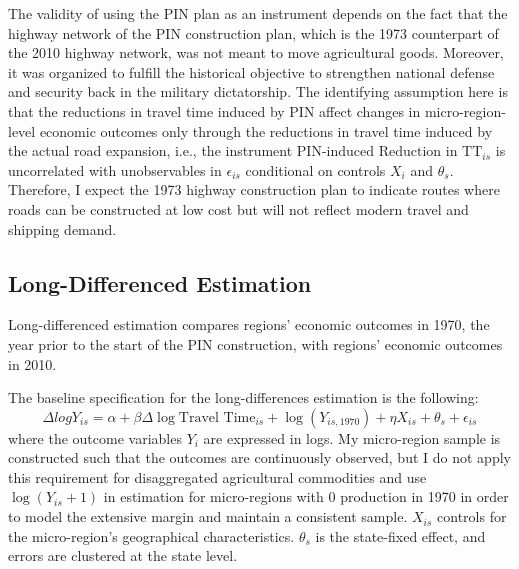 \documentclass[11pt]{article}
\begin{document}
The validity of using the PIN plan as an instrument depends on the fact that the highway network of the PIN construction plan, which is the 1973 counterpart of the 2010 highway network, was not meant to move agricultural goods. Moreover, it was organized to fulfill the historical objective to strengthen national defense and security back in the military dictatorship. The identifying assumption here is that the reductions in travel time induced by PIN affect changes in micro-region-level economic outcomes only through the reductions in travel time induced by the actual road expansion, i.e., the instrument \(\text{PIN-induced Reduction in TT}_{is}\) is uncorrelated with unobservables in \(\epsilon_{is}\) conditional on controls \(X_i\) and \(\theta_s\). Therefore, I expect the 1973 highway construction plan to indicate routes where roads can be constructed at low cost but will not reflect modern travel and shipping demand.

\subsection{Long-Differenced Estimation}
\label{sec:longdiff}

Long-differenced estimation compares regions' economic outcomes in 1970, the year prior to the start of the PIN construction, with regions' economic outcomes in 2010.

The baseline specification for the long-differences estimation is the following:
\begin{equation}
\Delta logY_{is} = \alpha+\beta \Delta \log \text{Travel Time}_{is} + \log(Y_{is, 1970}) + \eta X_{is} + \theta_s + \epsilon_{is}
\label{eq:longdiff}
\end{equation}
where the outcome variables $Y_i$ are expressed in logs. My micro-region sample is constructed such that the outcomes are continuously observed, but I do not apply this requirement for disaggregated agricultural commodities and use $\log(Y_{is}+1)$ in estimation for micro-regions with 0 production in 1970 in order to model the extensive margin and maintain a consistent sample. $X_{is}$ controls for the micro-region's geographical characteristics. \(\theta_s\) is the state-fixed effect, and errors are clustered at the state level. 
\end{document}
